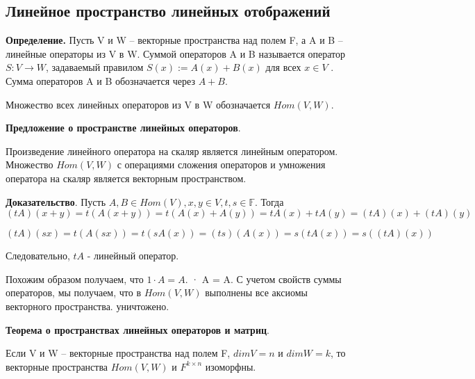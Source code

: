 \documentclass[a4paper]{article}
\begin{document}
\subsection*{Линейное пространство линейных отображений}
\textbf{Определение.} Пусть V и W – векторные пространства над полем F, а A и B – линейные операторы из V в W. Суммой операторов A и B называется оператор $S : V \rightarrow W$, задаваемый правилом $S(x) := A(x) + B(x)$ для всех $x \in V$ .
Сумма операторов A и B обозначается через $A + B$.

Множество всех линейных операторов из V в W обозначается $Hom(V, W)$.

\begin{htheorem}
\textbf{Предложение о пространстве линейных операторов}.

Произведение линейного оператора на скаляр является линейным
оператором. Множество $Hom(V, W)$ с операциями сложения операторов
и умножения оператора на скаляр является векторным пространством.
\end{htheorem}


\begin{hproof}
\textbf{Доказательство}. Пусть $A,B \in Hom(V), x,y \in V, t, s \in \mathbb{F}$. Тогда
\begin{equation}
(tA)(x+y) = t(A(x+y)) = t(A(x) + A(y)) = tA(x) + tA(y) = (tA)(x) + (tA)(y)
\end{equation}

\begin{equation}
(tA)(sx) = t(A(sx)) = t(sA(x)) = (ts)(A(x)) = s(tA(x)) = s((tA)(x))
\end{equation}

Следовательно, $tA$ - линейный оператор.

Похожим образом получаем, что $1 \cdot A = A$. · A = A. С учетом свойств суммы операторов, мы получаем,
что в $Hom(V, W)$ выполнены все аксиомы векторного пространства. уничтожено.
\end{hproof}

\begin{htheorem}
\textbf{Теорема о пространствах линейных операторов и матриц}.

Если V и W – векторные пространства над полем F, $dim V = n$ и
$dim W = k$, то векторные пространства $Hom(V,W)$ и $F^{k\times n}$ изоморфны.
\end{htheorem}
\end{document}
